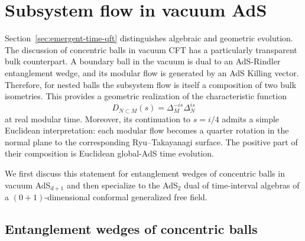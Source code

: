 \documentclass[a4paper,11pt]{article}
\theoremstyle{definition}
\begin{document}
\section{Subsystem flow in vacuum AdS}
\label{sec:bulk-subsystem-flow}



Section~\ref{sec:emergent-time-qft} distinguishes algebraic and geometric evolution. The discussion of concentric balls in vacuum CFT has a particularly
transparent bulk counterpart. A boundary ball in the vacuum is dual to an
AdS-Rindler entanglement wedge, and its modular flow is generated by an AdS
Killing vector. Therefore, for nested balls the subsystem flow is itself a
composition of two bulk isometries. This provides a geometric realization
of the characteristic function
\begin{equation}
    D_{N\subset M}(s)
    =
    \Delta_M^{-is}\Delta_N^{is}
\end{equation}
at real modular time. Moreover, its continuation to $s=i/4$ admits a
simple Euclidean interpretation: each modular flow becomes a quarter
rotation in the normal plane to the corresponding Ryu--Takayanagi
surface. The positive part of their composition is Euclidean global-AdS
time evolution.

We first discuss this statement for entanglement wedges of concentric
balls in vacuum AdS$_{d+1}$ and then specialize to the AdS$_2$ dual of
time-interval algebras of a $(0+1)$-dimensional conformal generalized free
field.

\subsection{Entanglement wedges of concentric balls}
\end{document}
